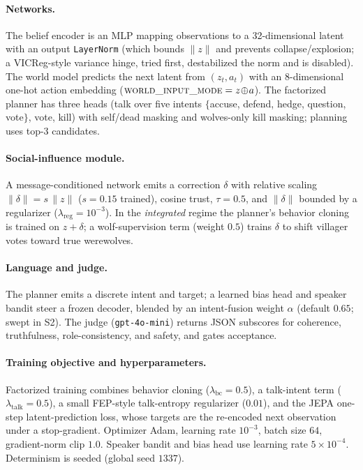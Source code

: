\documentclass[11pt]{article}
\begin{document}
\paragraph{Networks.} The belief encoder is an MLP mapping observations to a
32-dimensional latent with an output \texttt{LayerNorm} (which bounds
$\lVert z\rVert$ and prevents collapse/explosion; a VICReg-style variance hinge,
tried first, destabilized the norm and is disabled). The world model predicts the
next latent from $(z_t, a_t)$ with an 8-dimensional one-hot action embedding
($\textsc{world\_input\_mode}=z\!\oplus\!a$). The factorized planner has three heads
(talk over five intents $\{$accuse, defend, hedge, question, vote$\}$, vote, kill)
with self/dead masking and wolves-only kill masking; planning uses top-$3$
candidates.

\paragraph{Social-influence module.} A message-conditioned network emits a
correction $\delta$ with relative scaling $\lVert\delta\rVert = s\,\lVert z\rVert$
($s=0.15$ trained), cosine trust, $\tau=0.5$, and $\lVert\delta\rVert$ bounded by a
regularizer ($\lambda_{\text{reg}}=10^{-3}$). In the \emph{integrated} regime the
planner's behavior cloning is trained on $z+\delta$; a wolf-supervision term
(weight $0.5$) trains $\delta$ to shift villager votes toward true werewolves.

\paragraph{Language and judge.} The planner emits a discrete intent and target; a
learned bias head and speaker bandit steer a frozen decoder, blended by an
intent-fusion weight $\alpha$ (default $0.65$; swept in S2). The judge
(\texttt{gpt-4o-mini}) returns JSON subscores for coherence, truthfulness,
role-consistency, and safety, and gates acceptance.

\paragraph{Training objective and hyperparameters.} Factorized training combines
behavior cloning ($\lambda_{\text{bc}}=0.5$), a talk-intent term
($\lambda_{\text{talk}}=0.5$), a small FEP-style talk-entropy regularizer
($0.01$), and the JEPA one-step latent-prediction loss, whose targets are the
re-encoded next observation under a stop-gradient. Optimizer Adam, learning rate
$10^{-3}$, batch size $64$, gradient-norm clip $1.0$. Speaker bandit and bias head
use learning rate $5\times10^{-4}$. Determinism is seeded (global seed $1337$).
\end{document}
